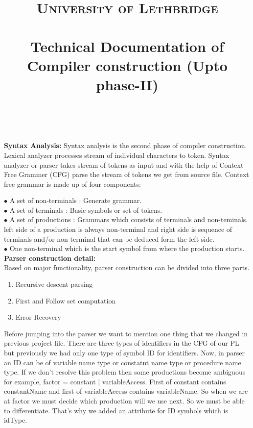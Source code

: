 \documentclass[paper=letter, fontsize=12pt]{scrartcl} %
\title{	
\normalfont \normalsize 
\textsc{University of Lethbridge} \\ [25pt] %
\horrule{0.5pt} \\[0.4cm] %
\huge Technical Documentation of Compiler construction (Upto phase-II)\\ %
\horrule{2pt} \\[0.5cm] %
}
\author{} %
\begin{document}
\maketitle
\newpage



{\bf Syntax Analysis:}
Syntax analysis is the second phase of compiler construction. Lexical analyzer processes stream of individual characters to token. Syntax analyzer or parser takes stream of tokens as input and with the help of Context Free Grammer (CFG) parse the stream of tokens we get from source file. Context free grammar is made up of four components:

$\bullet$ A set of non-terminals : Generate grammar.\\
$\bullet$ A set of terminals : Basic symbols or set of tokens.\\
$\bullet$ A set of productions : Grammars which consists of terminals and non-teminals. left side of a production is always non-terminal and right side is sequence of terminals and/or non-terminal that can be deduced form the left side.\\
$\bullet$ One non-terminal which is the start symbol from where the production starts.\\


{\bf Parser construction detail:}\\

Based on major functionality, parser construction can be divided into three parts.
\begin{enumerate}  
\item Recursive descent parsing 
\item First and Follow set computation
\item Error Recovery
\end{enumerate}

Before jumping into the parser we want to mention one thing that we changed in previous project file. There are three types of identifiers in the CFG of our PL but previously we had only one type of symbol ID for identifiers. Now, in parser an ID can be of variable name type or constatnt name type or procedure name type. If we don't resolve this problem then some productions become ambiguous for example, factor = constant | variableAccess. First of constant contains constantName and first of variableAccess contains variableName. So when we are at factor we must decide which production will we use next. So we must be able to differentiate. That's why we added an attribute for ID symbols which is idType.\\
\end{document}
